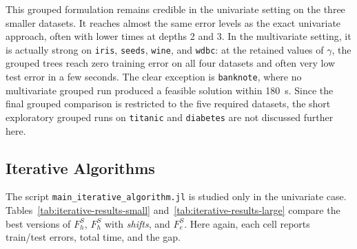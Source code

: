 \documentclass[11pt,a4paper]{article}
\begin{document}
\FloatBarrier

This grouped formulation remains credible in the univariate setting on the three smaller datasets. It reaches almost the same error levels as the exact univariate approach, often with lower times at depths 2 and 3. In the multivariate setting, it is actually strong on \texttt{iris}, \texttt{seeds}, \texttt{wine}, and \texttt{wdbc}: at the retained values of $\gamma$, the grouped trees reach zero training error on all four datasets and often very low test error in a few seconds. The clear exception is \texttt{banknote}, where no multivariate grouped run produced a feasible solution within \SI{180}{s}. Since the final grouped comparison is restricted to the five required datasets, the short exploratory grouped runs on \texttt{titanic} and \texttt{diabetes} are not discussed further here.

\subsection{Iterative Algorithms}

The script \texttt{main\_iterative\_algorithm.jl} is studied only in the univariate case. Tables~\ref{tab:iterative-results-small} and~\ref{tab:iterative-results-large} compare the best versions of $F_h^S$, $F_h^S$ with \emph{shifts}, and $F_e^S$. Here again, each cell reports train/test errors, total time, and the gap.
\end{document}
